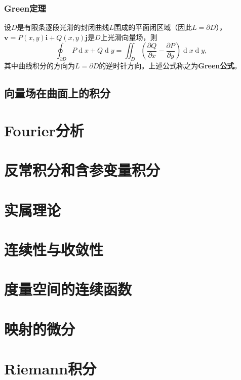 \documentclass[lang=cn,10pt]{elegantbook}
\newcommand\bv[1]{\boldsymbol{#1}}
\begin{document}
\subsection{Green定理}
\begin{theorem}[(Green)]
    设$D$是有限条逐段光滑的封闭曲线$L$围成的平面闭区域（因此$L = \partial D$），$\bv{v} = P(x,y)\bv{i} + Q(x,y) \bv{j}$是$D$上光滑向量场，则
    \begin{equation}
        \oint_{\partial D}P\operatorname{d}x+Q\operatorname{d}y=\iint_D\left(\frac{\partial Q}{\partial x}-\frac{\partial P}{\partial y}\right)\operatorname{d}x\operatorname{d}y,
    \end{equation}
    其中曲线积分的方向为$L = \partial D$的逆时针方向。上述公式称之为\textbf{Green公式}。
\end{theorem}








\section{向量场在曲面上的积分}



\chapter{Fourier分析}
\chapter{反常积分和含参变量积分}
\chapter{实属理论}

\chapter{连续性与收敛性}
\chapter{度量空间的连续函数}
\chapter{映射的微分}
\chapter{Riemann积分}
\end{document}
